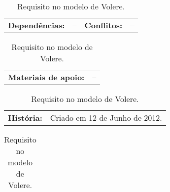 \begin{table}[h]
    \vspace{5pt}
    \begin{tabularx}{\textwidth}{p{}p{}
                                 p{}p{}}
        \textbf{Dependências:} & --
        & \textbf{Conflitos:} & -- \\
    \end{tabularx}
    
    \vspace{5pt}
    \begin{tabularx}{\textwidth}{p{} p{}}
        \textbf{Materiais de apoio:} &
       --
    \end{tabularx}
    
    \vspace{5pt}
    \begin{tabularx}{\textwidth}{p{} p{}}
        \textbf{História:} &
        Criado em 12 de Junho de 2012. \\
    \end{tabularx}
    
    \begin{tabularx}{\textwidth}{c}
        \bottomrule
    \end{tabularx}
    
    \caption{ \label{Volere5} Requisito no modelo de Volere. }
\end{table}
